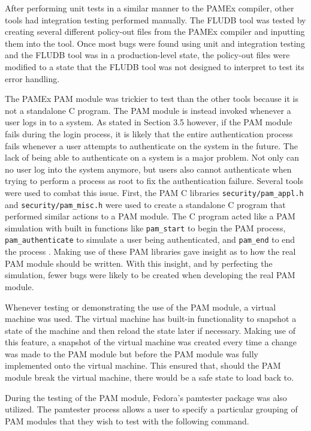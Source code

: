 After performing unit tests in a similar manner to the PAMEx compiler, 
other tools had integration testing performed manually. The FLUDB tool 
was tested by creating several different policy-out files from the 
PAMEx compiler and inputting them into the tool. Once
most bugs were found using unit and integration testing and the FLUDB tool 
was in a production-level state, the policy-out files were modified to a state that the FLUDB tool was not designed to interpret to 
test its error handling.  

The PAMEx PAM module was trickier to test than the other tools because 
it is not a standalone C program. The PAM module is instead invoked 
whenever a user logs in to a system. As stated in Section 3.5 
however, if the PAM module fails during the login process, it is 
likely that the entire authentication process fails whenever a user 
attempts to authenticate on the system in the future. The lack of being able to 
authenticate on a system is a major problem. Not only can no user 
log into the system anymore, but users also cannot authenticate when 
trying to perform a process as root to fix the authentication failure. Several tools were used to 
combat this issue. First, the PAM C 
libraries \texttt{security/pam\_appl.h} and \texttt{security/pam\_misc.h} were used to create a standalone C program that performed similar 
actions to a PAM module. The C program acted like a PAM 
simulation with built in functions like \texttt{pam\_start} to begin the PAM 
process, \texttt{pam\_authenticate} to simulate a user being authenticated, and 
\texttt{pam\_end} to end the process \cite{man7pam}. Making use of these PAM libraries gave insight as to how the real PAM module should be written. With 
this insight, and by perfecting the simulation, fewer bugs were likely to be created when developing the real PAM module.  

Whenever testing or demonstrating the use of the PAM module, a virtual machine was used. The virtual machine has built-in 
functionality to snapshot a state of the machine and then reload the 
state later if necessary. Making use of this feature, a snapshot of the virtual machine was created every time a change was made 
to the PAM module but before the PAM module was fully implemented onto 
the virtual machine. This ensured that, should the PAM module break the 
virtual machine, there would be a safe state to load back to.  

During the testing of the PAM module, 
Fedora’s pamtester package was also utilized. The pamtester process allows a user to 
specify a particular grouping of PAM modules that they wish to test 
with the following command.  

